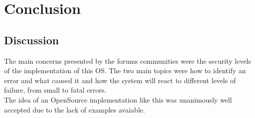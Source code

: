 \chapter{Conclusion}\label{ch:conclusion}

\section{Discussion}
The main concerns presented by the forums communities were the security levels of the implementation of this 
OS. The two main topics were how to identify an error and what caused it and how the system will react to
 different levels of failure, from small to fatal errors.\\
The idea of an OpenSource implementation like this was unanimously well accepted due to the lack of examples
avaiable.
